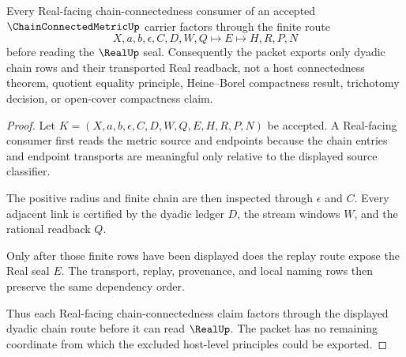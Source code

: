 \begin{theorem}
\label{thm:chain-connected-metric-real-completion-boundary}
Every Real-facing chain-connectedness consumer of an accepted $\ChainConnectedMetricUp$ carrier factors through the finite route
$$
X,a,b,\epsilon,C,D,W,Q \longmapsto E \longmapsto H,R,P,N
$$
before reading the $\RealUp$ seal. Consequently the packet exports only dyadic chain rows and their transported Real readback, not a host connectedness theorem, quotient equality principle, Heine--Borel compactness result, trichotomy decision, or open-cover compactness claim.
\end{theorem}
\begin{proof}
Let $K=(X,a,b,\epsilon,C,D,W,Q,E,H,R,P,N)$ be accepted. A Real-facing consumer first reads the metric source and endpoints because the chain entries and endpoint transports are meaningful only relative to the displayed source classifier.

The positive radius and finite chain are then inspected through $\epsilon$ and $C$. Every adjacent link is certified by the dyadic ledger $D$, the stream windows $W$, and the rational readback $Q$.

Only after those finite rows have been displayed does the replay route expose the Real seal $E$. The transport, replay, provenance, and local naming rows then preserve the same dependency order.

Thus each Real-facing chain-connectedness claim factors through the displayed dyadic chain route before it can read $\RealUp$. The packet has no remaining coordinate from which the excluded host-level principles could be exported.
\end{proof}


\begin{closurestatus}{\ChainConnectedMetricUp}
  \theoryclosure{\seedClosure}
  \formalstatus{\unformalizedV}
\end{closurestatus}
